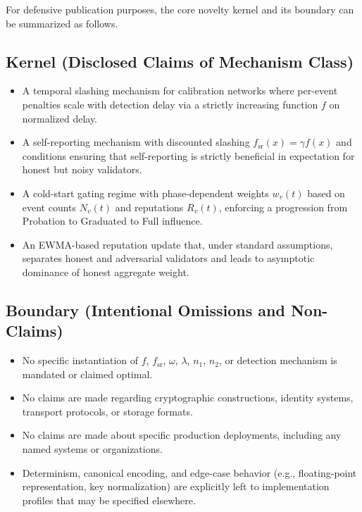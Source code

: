 \documentclass[11pt]{article}
\theoremstyle{plain}
\theoremstyle{definition}
\begin{document}
For defensive publication purposes, the core novelty kernel and its boundary can be summarized as follows.

\subsection{Kernel (Disclosed Claims of Mechanism Class)}

\begin{itemize}[leftmargin=*]
  \item A temporal slashing mechanism for calibration networks where per-event penalties scale with detection delay via a strictly increasing function \(f\) on normalized delay.
  \item A self-reporting mechanism with discounted slashing \(f_{\mathrm{sr}}(x) = \gamma f(x)\) and conditions ensuring that self-reporting is strictly beneficial in expectation for honest but noisy validators.
  \item A cold-start gating regime with phase-dependent weights \(w_v(t)\) based on event counts \(N_v(t)\) and reputations \(R_v(t)\), enforcing a progression from Probation to Graduated to Full influence.
  \item An EWMA-based reputation update that, under standard assumptions, separates honest and adversarial validators and leads to asymptotic dominance of honest aggregate weight.
\end{itemize}

\subsection{Boundary (Intentional Omissions and Non-Claims)}

\begin{itemize}[leftmargin=*]
  \item No specific instantiation of \(f\), \(f_{\mathrm{sr}}\), \(\omega\), \(\lambda\), \(n_1\), \(n_2\), or detection mechanism is mandated or claimed optimal.
  \item No claims are made regarding cryptographic constructions, identity systems, transport protocols, or storage formats.
  \item No claims are made about specific production deployments, including any named systems or organizations.
  \item Determinism, canonical encoding, and edge-case behavior (e.g., floating-point representation, key normalization) are explicitly left to implementation profiles that may be specified elsewhere.
\end{itemize}
\end{document}
